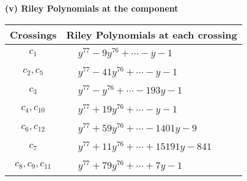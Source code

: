 \documentclass[1p]{elsarticle_modified}
\theoremstyle{definition}
\begin{document}
\newpage\renewcommand{\arraystretch}{1}
\flushleft \textbf{(v) Riley Polynomials at the component}\newline \\
\begin{tabular}{m{50pt}|m{274pt}}
Crossings & \hspace{64pt}Riley Polynomials at each crossing \\
\hline $$\begin{aligned}c_{1}\end{aligned}$$&$\begin{aligned}
&y^{77}-9 y^{76}+\cdots- y-1
\end{aligned}$\\
\hline $$\begin{aligned}c_{2},c_{5}\end{aligned}$$&$\begin{aligned}
&y^{77}-41 y^{76}+\cdots- y-1
\end{aligned}$\\
\hline $$\begin{aligned}c_{3}\end{aligned}$$&$\begin{aligned}
&y^{77}- y^{76}+\cdots-193 y-1
\end{aligned}$\\
\hline $$\begin{aligned}c_{4},c_{10}\end{aligned}$$&$\begin{aligned}
&y^{77}+19 y^{76}+\cdots- y-1
\end{aligned}$\\
\hline $$\begin{aligned}c_{6},c_{12}\end{aligned}$$&$\begin{aligned}
&y^{77}+59 y^{76}+\cdots-1401 y-9
\end{aligned}$\\
\hline $$\begin{aligned}c_{7}\end{aligned}$$&$\begin{aligned}
&y^{77}+11 y^{76}+\cdots+15191 y-841
\end{aligned}$\\
\hline $$\begin{aligned}c_{8},c_{9},c_{11}\end{aligned}$$&$\begin{aligned}
&y^{77}+79 y^{76}+\cdots+7 y-1
\end{aligned}$\\
\hline
\end{tabular}\\~\\
\end{document}
